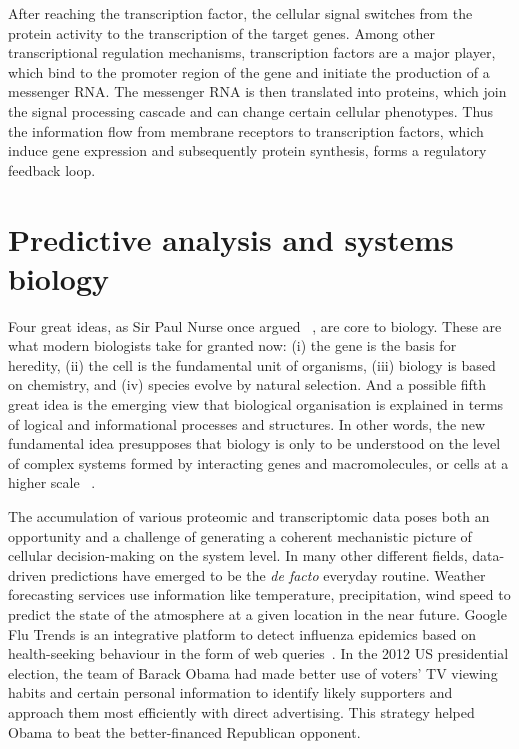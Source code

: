 After reaching the transcription factor, 
the cellular signal switches from the
protein activity to the transcription of the target genes. 
Among other transcriptional regulation mechanisms,
transcription factors are a major player,
which bind to the promoter region of the gene and initiate the production
of a messenger RNA. The messenger RNA is then translated into proteins,
which join the signal processing cascade and can change certain cellular 
phenotypes. Thus the information flow from membrane receptors to transcription
factors, which induce gene expression and subsequently protein synthesis, 
forms a regulatory feedback loop.

\section{Predictive analysis and systems biology}
Four great ideas, as Sir Paul Nurse once argued~%
\citep{Nurse2003}, are core to biology. These are what
modern biologists take for granted now: (i) the gene is the basis for heredity, (ii) the cell is the fundamental unit of organisms, (iii) biology is based on chemistry, and (iv) species evolve by natural selection. And a possible fifth great 
idea is the emerging view that biological organisation is explained in terms of logical
and informational processes and structures. 
In other words, 
the new fundamental idea presupposes that biology is only to be 
understood
on the level of complex systems formed by interacting genes and macromolecules, or cells at a higher scale~%
\citep{Vidal2009}.

The accumulation of various proteomic and transcriptomic
data poses both an opportunity and a challenge of 
generating a coherent 
mechanistic picture of cellular decision-making on the 
system level. In many
other different fields, data-driven predictions have 
emerged to be the \emph{de facto} everyday routine. Weather
forecasting services use information like temperature, 
precipitation, wind speed to predict the state of the 
atmosphere at a given location in the near future. Google
Flu Trends is an integrative platform to detect influenza
epidemics based on health-seeking behaviour in the form of 
web queries~\citep{Ginsberg2009}. In the 2012 US presidential
election, the team of Barack Obama had made better use of 
voters' TV viewing habits and certain personal information 
to identify likely supporters and
approach them most efficiently with direct advertising. 
This strategy helped Obama to beat the better-financed
Republican opponent.

